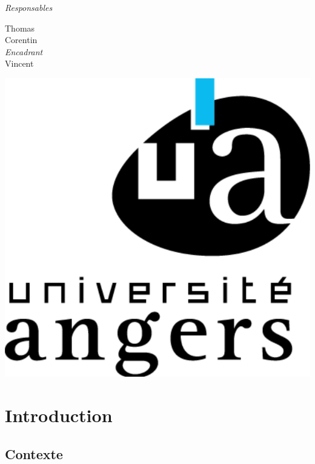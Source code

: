 \documentclass{report}
\begin{document}
\begin{titlepage}
\begin{center}
	\vspace{0.5cm}
	\emph{Responsables}\\
	\vspace{0.1cm}

	Thomas \\
	Corentin \\
	
	\vspace{0.5cm}
	\emph{Encadrant}\\
	\vspace{0.1cm}
	Vincent 
	\end{center}		
	
		
	\vspace{1.5cm}
	\hspace{15cm}\includegraphics[scale = 0.1]{img/logo.png}

    
    
\end{titlepage}


\tableofcontents

\chapter{Introduction}

	\section{Contexte}
		 \label{contexte}
	
\end{document}
